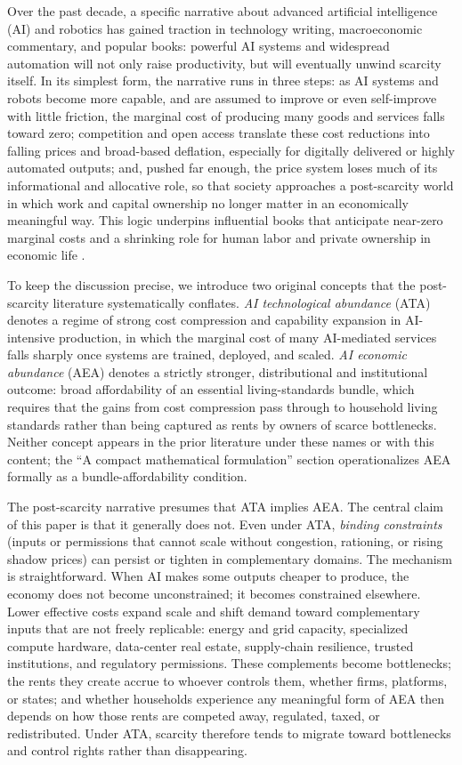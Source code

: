 \documentclass[11pt]{article}
\begin{document}
Over the past decade, a specific narrative about advanced artificial intelligence (AI) and robotics has gained traction in technology writing, macroeconomic commentary, and popular books: powerful AI systems and widespread automation will not only raise productivity, but will eventually unwind scarcity itself. In its simplest form, the narrative runs in three steps: as AI systems and robots become more capable, and are assumed to improve or even self-improve with little friction, the marginal cost of producing many goods and services falls toward zero; competition and open access translate these cost reductions into falling prices and broad-based deflation, especially for digitally delivered or highly automated outputs; and, pushed far enough, the price system loses much of its informational and allocative role, so that society approaches a post-scarcity world in which work and capital ownership no longer matter in an economically meaningful way. This logic underpins influential books that anticipate near-zero marginal costs and a shrinking role for human labor and private ownership in economic life \citep{Rifkin2014, SrnicekWilliams2015, Bastani2019, Harari2016, Ford2015, Susskind2020, Moleka2025}.

To keep the discussion precise, we introduce two original concepts that the post-scarcity literature systematically conflates. \emph{AI technological abundance} (ATA) denotes a regime of strong cost compression and capability expansion in AI-intensive production, in which the marginal cost of many AI-mediated services falls sharply once systems are trained, deployed, and scaled. \emph{AI economic abundance} (AEA) denotes a strictly stronger, distributional and institutional outcome: broad affordability of an essential living-standards bundle, which requires that the gains from cost compression pass through to household living standards rather than being captured as rents by owners of scarce bottlenecks. Neither concept appears in the prior literature under these names or with this content; the ``A compact mathematical formulation'' section operationalizes AEA formally as a bundle-affordability condition.

The post-scarcity narrative presumes that ATA implies AEA. The central claim of this paper is that it generally does not. Even under ATA, \emph{binding constraints} (inputs or permissions that cannot scale without congestion, rationing, or rising shadow prices) can persist or tighten in complementary domains. The mechanism is straightforward. When AI makes some outputs cheaper to produce, the economy does not become unconstrained; it becomes constrained elsewhere. Lower effective costs expand scale and shift demand toward complementary inputs that are not freely replicable: energy and grid capacity, specialized compute hardware, data-center real estate, supply-chain resilience, trusted institutions, and regulatory permissions. These complements become bottlenecks; the rents they create accrue to whoever controls them, whether firms, platforms, or states; and whether households experience any meaningful form of AEA then depends on how those rents are competed away, regulated, taxed, or redistributed. Under ATA, scarcity therefore tends to migrate toward bottlenecks and control rights rather than disappearing.
\end{document}
